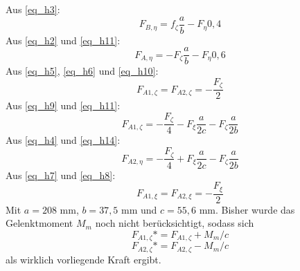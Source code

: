 Aus \ref{eq_h3}:
\begin{equation}\label{eq_h11}
	F_{B,\eta} = f_\zeta \frac{a}{b} - F_\eta 0,4
\end{equation}
Aus \ref{eq_h2} und \ref{eq_h11}:
\begin{equation}\label{eq_h12}
	F_{A, \eta} = -F_\zeta \frac{a}{b} - F_\eta 0,6
\end{equation}
Aus \ref{eq_h5}, \ref{eq_h6} und \ref{eq_h10}:
\begin{equation}\label{eq_h13}
	F_{A1, \zeta} = F_{A2, \zeta} = -\frac{F_\zeta}{2}
\end{equation}
Aus \ref{eq_h9} und \ref{eq_h11}:
\begin{equation}\label{eq_h14}
	F_{A1, \zeta} = -\frac{F_\zeta}{4}-F_\xi \frac{a}{2c}-F_\zeta \frac{a}{2b}
\end{equation}
Aus \ref{eq_h4} und \ref{eq_h14}:
\begin{equation}\label{eq_h15}
	F_{A2, \eta} = -\frac{F_\zeta}{4}+F_\xi \frac{a}{2c}-F_\zeta \frac{a}{2b}
\end{equation}
Aus \ref{eq_h7} und \ref{eq_h8}:
\begin{equation}\label{eq_h16}
F_{A1, \xi} = F_{A2, \xi} = -\frac{F_{\xi}}{2}
\end{equation}
Mit $a = 208$ mm, $b=37,5$ mm und $c = 55,6$ mm.
Bisher wurde das Gelenktmoment $M_m$ noch nicht berücksichtigt, sodass sich
\begin{equation}
	F_{A1,\zeta}* = F_{A1,\zeta} +M_m/c
\end{equation}
\begin{equation}
F_{A2,\zeta}* = F_{A2,\zeta} -M_m/c
\end{equation}
 als wirklich vorliegende Kraft ergibt.
